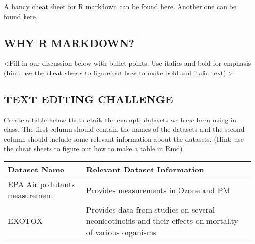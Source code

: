 \documentclass[]{article}
\begin{document}
A handy cheat sheet for R markdown can be found
\href{https://www.rstudio.com/wp-content/uploads/2015/03/rmarkdown-reference.pdf}{here}.
Another one can be found
\href{https://www.rstudio.com/wp-content/uploads/2015/02/rmarkdown-cheatsheet.pdf}{here}.

\hypertarget{why-r-markdown}{%
\subsection{WHY R MARKDOWN?}\label{why-r-markdown}}

\textless{}Fill in our discussion below with bullet points. Use italics
and bold for emphasis (hint: use the cheat sheets to figure out how to
make bold and italic text).\textgreater{}

\hypertarget{text-editing-challenge}{%
\subsection{TEXT EDITING CHALLENGE}\label{text-editing-challenge}}

Create a table below that details the example datasets we have been
using in class. The first column should contain the names of the
datasets and the second column should include some relevant information
about the datasets. (Hint: use the cheat sheets to figure out how to
make a table in Rmd)

\begin{longtable}[]{@{}ll@{}}
\toprule
\begin{minipage}[b]{0.42\columnwidth}\raggedright
Dataset Name\strut
\end{minipage} & \begin{minipage}[b]{0.52\columnwidth}\raggedright
Relevant Dataset Information\strut
\end{minipage}\tabularnewline
\midrule
\endhead
\begin{minipage}[t]{0.42\columnwidth}\raggedright
EPA Air pollutants measurement\strut
\end{minipage} & \begin{minipage}[t]{0.52\columnwidth}\raggedright
Provides measurements in Ozone and PM\strut
\end{minipage}\tabularnewline
\begin{minipage}[t]{0.42\columnwidth}\raggedright
EXOTOX\strut
\end{minipage} & \begin{minipage}[t]{0.52\columnwidth}\raggedright
Provides data from studies on several neonicotinoids and their effects
on mortality of various organisms\strut
\end{minipage}\tabularnewline
\bottomrule
\end{longtable}
\end{document}
